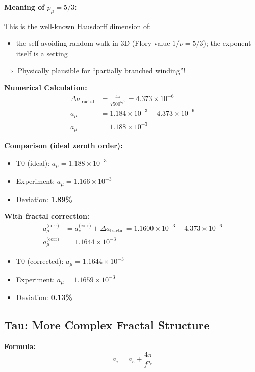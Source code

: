 	\textbf{Meaning of $p_\mu = 5/3$:}
	
	This is the well-known Hausdorff dimension of:
	\begin{itemize}
		\item the self-avoiding random walk in 3D (Flory value $1/\nu = 5/3$); the exponent itself is a setting
	\end{itemize}
	
	$\Rightarrow$ Physically plausible for ``partially branched winding''!
	
	\textbf{Numerical Calculation:}
	\begin{align}
		\Delta a_{\text{fractal}} &= \frac{4\pi}{7500^{5/3}} = 4.373 \times 10^{-6} \\
		a_\mu &= 1.184 \times 10^{-3} + 4.373 \times 10^{-6} \\
		a_\mu &= 1.188 \times 10^{-3}
	\end{align}
	
	\textbf{Comparison (ideal zeroth order):}
	\begin{itemize}
		\item T0 (ideal): $a_\mu = 1.188 \times 10^{-3}$
		\item Experiment: $a_\mu = 1.166 \times 10^{-3}$
		\item Deviation: \textbf{1.89\%}
	\end{itemize}
	
	\textbf{With fractal correction:}
	\begin{align}
		a_\mu^\text{(corr)} &= a_e^\text{(corr)} + \Delta a_\text{fractal} = 1.1600 \times 10^{-3} + 4.373 \times 10^{-6} \\
		a_\mu^\text{(corr)} &= 1.1644 \times 10^{-3}
	\end{align}
	\begin{itemize}
		\item T0 (corrected): $a_\mu = 1.1644 \times 10^{-3}$
		\item Experiment: $a_\mu = 1.1659 \times 10^{-3}$
		\item Deviation: \textbf{0.13\%}
	\end{itemize}
	
	\subsection{Tau: More Complex Fractal Structure}
	
	\textbf{Formula:}
	\begin{equation}
		a_\tau = a_e + \frac{4\pi}{f^{p_\tau}}
		\label{eq:atau}
	\end{equation}
	
